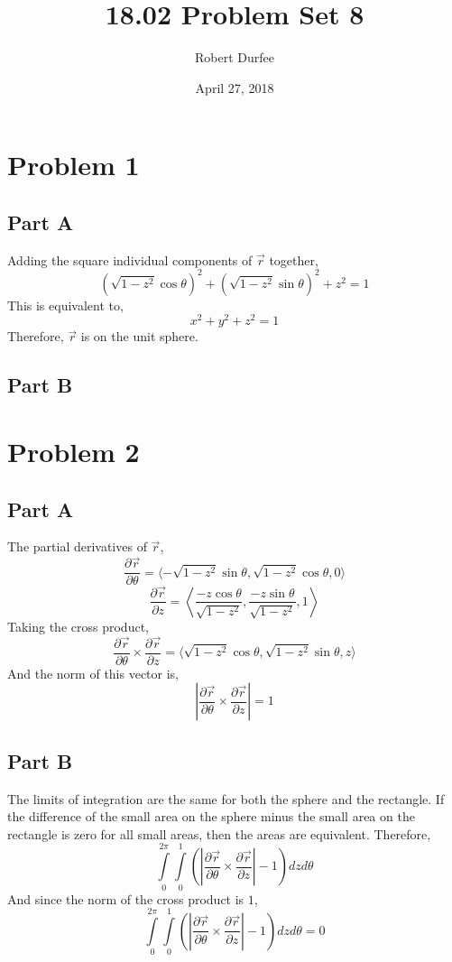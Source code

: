 \documentclass{article}
\title{18.02 Problem Set 8}
\author{Robert Durfee}
\date{April 27, 2018}
\begin{document}
\maketitle

\section*{Problem 1}

\subsection*{Part A}

Adding the square individual components of $\vec{r}$ together,
$$ \left(\sqrt{1 - z^2} \cos \theta \right)^2 + \left(\sqrt{1 - z^2} \sin
\theta\right)^2 + z^2 = 1 $$
This is equivalent to,
$$ x^2 + y^2 + z^2 = 1 $$
Therefore, $\vec{r}$ is on the unit sphere.

\subsection*{Part B}


\section*{Problem 2}

\subsection*{Part A}

The partial derivatives of $\vec{r}$,
$$ \frac{\partial \vec{r}}{\partial \theta} = \langle -\sqrt{1 - z^2} \sin
\theta, \sqrt{1 - z^2} \cos \theta, 0 \rangle $$
$$ \frac{\partial \vec{r}}{\partial z} = \left\langle \frac{-z \cos
\theta}{\sqrt{1 - z^2}}, \frac{-z \sin \theta}{\sqrt{1 - z^2}}, 1
\right\rangle $$
Taking the cross product,
$$ \frac{\partial \vec{r}}{\partial \theta} \times \frac{\partial
\vec{r}}{\partial z} = \langle \sqrt{1 - z^2} \cos \theta, \sqrt{1 - z^2} \sin
\theta, z \rangle $$
And the norm of this vector is,
$$ \left\vert \frac{\partial \vec{r}}{\partial \theta} \times \frac{\partial
\vec{r}}{\partial z} \right\vert = 1 $$

\subsection*{Part B}

The limits of integration are the same for both the sphere and the rectangle. If
the difference of the small area on the sphere minus the small area on the
rectangle is zero for all small areas, then the areas are equivalent. Therefore,
$$ \int\limits_0^{2\pi}\int\limits_0^{1} \left( \left\vert \frac{\partial
\vec{r}}{\partial \theta} \times \frac{\partial \vec{r}}{\partial z} \right\vert
- 1\right) dz d\theta $$
And since the norm of the cross product is $1$,
$$ \int\limits_0^{2\pi}\int\limits_0^{1} \left( \left\vert \frac{\partial
\vec{r}}{\partial \theta} \times \frac{\partial \vec{r}}{\partial z} \right\vert
- 1\right) dz d\theta = 0 $$
\end{document}
